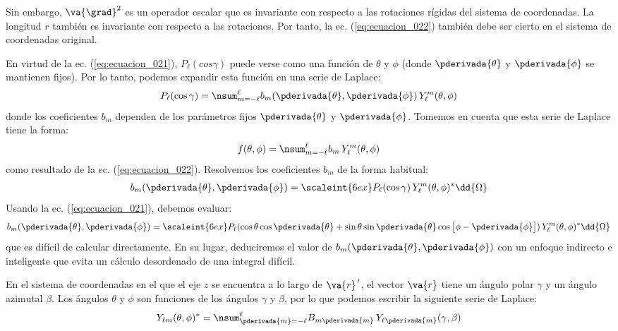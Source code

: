Sin embargo, $\va{\grad}^{2}$ es un operador escalar que es invariante con respecto a las rotaciones rígidas del sistema de coordenadas. La longitud $r$ también es invariante con respecto a las rotaciones. Por tanto, la ec. (\ref{eq:ecuacion_022}) también debe ser cierto en el sistema de coordenadas original.
\par
En virtud de la ec. (\ref{eq:ecuacion_021}), $P_{\ell} (cos \gamma)$ puede verse como una función de $\theta$ y $\phi$ (donde $\pderivada{\theta}$ y $\pderivada{\phi}$ se mantienen fijos). Por lo tanto, podemos expandir esta función en una serie de Laplace:
\begin{align}
P_{\ell} (\cos \gamma) = \nsum_{m=-\ell}^{\ell} b_{m} (\pderivada{\theta}, \pderivada{\phi}) \, Y_{\ell}^{m} (\theta, \phi)
\label{eq:ecuacion_023}
\end{align}
donde los coeficientes $b_{m}$ dependen de los parámetros fijos $\pderivada{\theta}$ y $\pderivada{\phi}$. Tomemos en cuenta que esta serie de Laplace tiene la forma:
\begin{align}
f(\theta, \phi) = \nsum_{m=-\ell}^{\ell} b_{m} \, Y_{\ell}^{m} (\theta, \phi)
\label{eq:ecuacion_019}
\end{align}
como resultado de la ec. (\ref{eq:ecuacion_022}). Resolvemos los coeficientes $b_{m}$ de la forma habitual:
\begin{align}
b_{m} (\pderivada{\theta}, \pderivada{\phi}) = \scaleint{6ex} P_{\ell} (\cos \gamma) \, Y_{\ell}^{m} (\theta, \phi)^{*} \dd{\Omega}
\end{align}
Usando la ec. (\ref{eq:ecuacion_021}), debemos evaluar:
\begin{align}
b_{m} (\pderivada{\theta}, \pderivada{\phi}) = \scaleint{6ex} P_{\ell} (\cos \theta \cos \pderivada{\theta} + \sin \theta \sin \pderivada{\theta} \cos \big[ \phi - \pderivada{\phi} \big]) \, Y_{\ell}^{m} (\theta, \phi)^{*} \dd{\Omega}
\label{eq:ecuacion_024}
\end{align}
que es difícil de calcular directamente. En su lugar, deduciremos el valor de $b_{m} (\pderivada{\theta}, \pderivada{\phi})$ con un enfoque indirecto e inteligente que evita un cálculo desordenado de una integral difícil.
\par
En el sistema de coordenadas en el que el eje $z$ se encuentra a lo largo de $\va{r}^{\, \prime}$, el vector $\va{r}$ tiene un ángulo polar $\gamma$ y un ángulo azimutal $\beta$. Los ángulos $\theta$ y $\phi$ son funciones de los ángulos $\gamma$ y $\beta$, por lo que podemos escribir la siguiente serie de Laplace:
\begin{align}
Y_{\ell m} (\theta, \phi)^{*} = \nsum_{\pderivada{m}=-\ell}^{\ell} B_{m \pderivada{m}} \, Y_{\ell \pderivada{m}} (\gamma, \beta)
\label{eq:ecuacion_025}
\end{align}
